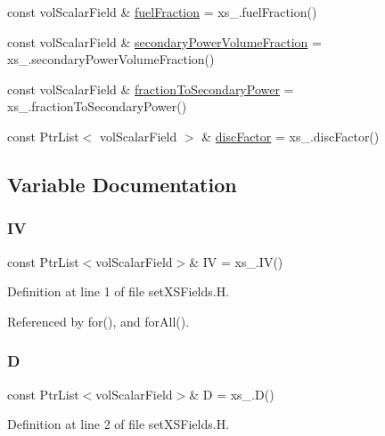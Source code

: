 \begin{DoxyCompactItemize}
\item 
const vol\+Scalar\+Field \& \hyperlink{setXSFields_8H_a470c39405a89f3faff1aaaec7855c71f}{fuel\+Fraction} = xs\+\_\+.\+fuel\+Fraction()
\item 
const vol\+Scalar\+Field \& \hyperlink{setXSFields_8H_a8a174336055259a9d6e186e9ceb2f629}{secondary\+Power\+Volume\+Fraction} = xs\+\_\+.\+secondary\+Power\+Volume\+Fraction()
\item 
const vol\+Scalar\+Field \& \hyperlink{setXSFields_8H_a333f327f48d6300db4dcab219afd7d02}{fraction\+To\+Secondary\+Power} = xs\+\_\+.\+fraction\+To\+Secondary\+Power()
\item 
const Ptr\+List$<$ vol\+Scalar\+Field $>$ \& \hyperlink{setXSFields_8H_aca0aa696c44af08f57bdca6faeba4e82}{disc\+Factor} = xs\+\_\+.\+disc\+Factor()
\end{DoxyCompactItemize}


\subsection{Variable Documentation}
\mbox{\label{setXSFields_8H_ab9a5192c8e8349e3031f4f584230968f}} 
\subsubsection{\texorpdfstring{IV}{IV}}
{\footnotesize\ttfamily const Ptr\+List$<$vol\+Scalar\+Field$>$\& IV = xs\+\_\+.\+IV()}



Definition at line 1 of file set\+X\+S\+Fields.\+H.



Referenced by for(), and for\+All().

\mbox{\label{setXSFields_8H_a70ac93a527a85b4edf386830643d1561}} 
\subsubsection{\texorpdfstring{D}{D}}
{\footnotesize\ttfamily const Ptr\+List$<$vol\+Scalar\+Field$>$\& D = xs\+\_\+.\+D()}



Definition at line 2 of file set\+X\+S\+Fields.\+H.



